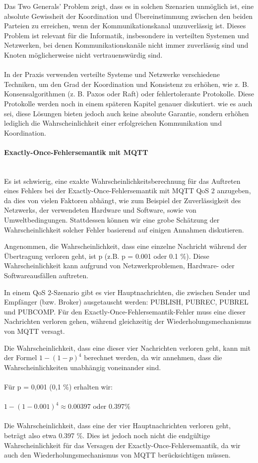 Das Two Generals' Problem zeigt, dass es in solchen Szenarien unmöglich ist, eine absolute Gewissheit der Koordination und Übereinstimmung zwischen den beiden Parteien zu erreichen, wenn der Kommunikationskanal unzuverlässig ist. Dieses Problem ist relevant für die Informatik, insbesondere in verteilten Systemen und Netzwerken, bei denen Kommunikationskanäle nicht immer zuverlässig sind und Knoten möglicherweise nicht vertrauenswürdig sind.
\\\\
In der Praxis verwenden verteilte Systeme und Netzwerke verschiedene Techniken, um den Grad der Koordination und Konsistenz zu erhöhen, wie z. B. Konsensalgorithmen (z. B. Paxos oder Raft) oder fehlertolerante Protokolle. Diese Protokolle werden noch in einem späteren Kapitel genauer diskutiert. wie es auch sei, diese Lösungen bieten jedoch auch keine absolute Garantie, sondern erhöhen lediglich die Wahrscheinlichkeit einer erfolgreichen Kommunikation und Koordination.

\paragraph{Exactly-Once-Fehlersemantik mit MQTT\\\\}

Es ist schwierig, eine exakte Wahrscheinlichkeitsberechnung für das Auftreten eines Fehlers bei der Exactly-Once-Fehlersemantik mit MQTT QoS 2 anzugeben, da dies von vielen Faktoren abhängt, wie zum Beispiel der Zuverlässigkeit des Netzwerks, der verwendeten Hardware und Software, sowie von Umweltbedingungen. Stattdessen können wir eine grobe Schätzung der Wahrscheinlichkeit solcher Fehler basierend auf einigen Annahmen diskutieren.

Angenommen, die Wahrscheinlichkeit, dass eine einzelne Nachricht während der Übertragung verloren geht, ist p (z.B. p = 0.001 oder 0.1 \%). Diese Wahrscheinlichkeit kann aufgrund von Netzwerkproblemen, Hardware- oder Softwareausfällen auftreten.

In einem QoS 2-Szenario gibt es vier Hauptnachrichten, die zwischen Sender und Empfänger (bzw. Broker) ausgetauscht werden: PUBLISH, PUBREC, PUBREL und PUBCOMP. Für den Exactly-Once-Fehlersemantik-Fehler muss eine dieser Nachrichten verloren gehen, während gleichzeitig der Wiederholungsmechanismus von MQTT versagt.

Die Wahrscheinlichkeit, dass eine dieser vier Nachrichten verloren geht, kann mit der Formel $1 - (1 - p)^4$ berechnet werden, da wir annehmen, dass die Wahrscheinlichkeiten unabhängig voneinander sind.
\\\\
Für p = 0,001 (0,1 \%) erhalten wir:
\\\\
$1 - (1 - 0.001)^4 \approx 0.00397$ oder $0.397 \%$
\\\\
Die Wahrscheinlichkeit, dass eine der vier Hauptnachrichten verloren geht, beträgt also etwa 0.397 \%. Dies ist jedoch noch nicht die endgültige Wahrscheinlichkeit für das Versagen der Exactly-Once-Fehlersemantik, da wir auch den Wiederholungsmechanismus von MQTT berücksichtigen müssen.

